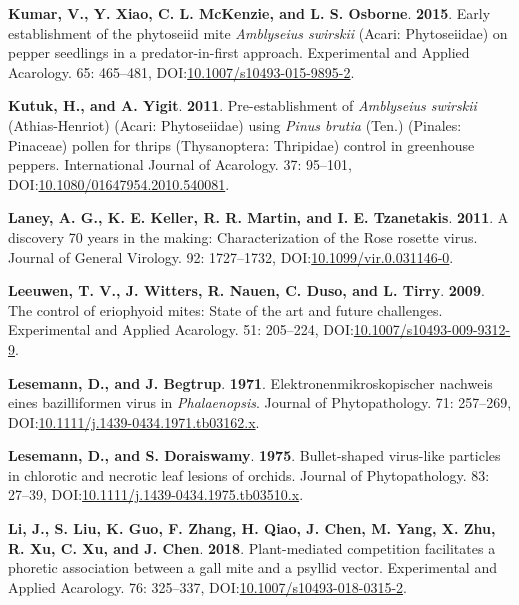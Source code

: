 \documentclass[12pt,final,CPage]{ufthesis}
\newlength{\cslhangindent}
\newenvironment{CSLReferences}[2] %
{%
	\setlength{\parindent}{0pt}
	\ifodd #1 \everypar{\setlength{\hangindent}{\cslhangindent}}\ignorespaces\fi
	\ifnum #2 > 0
	\setlength{\parskip}{#2\baselineskip}
	\fi
}%
{}
\begin{document}
{\begin{CSLReferences}{1}{0}
  \leavevmode{}%
  \textbf{Kumar, V., Y. Xiao, C. L. McKenzie, and L. S. Osborne}. \textbf{2015}. Early establishment of the phytoseiid mite {\emph{Amblyseius swirskii}} ({Acari}: {Phytoseiidae}) on pepper seedlings in a predator-in-first approach. Experimental and Applied Acarology. 65: 465--481, DOI:\href{https://doi.org/10.1007/s10493-015-9895-2}{10.1007/s10493-015-9895-2}.

  \leavevmode{}%
  \textbf{Kutuk, H., and A. Yigit}. \textbf{2011}. Pre-establishment of {\emph{Amblyseius swirskii}} {(Athias-Henriot)} {({Acari}: {Phytoseiidae})} using {\emph{Pinus brutia}} {(Ten.)} {(Pinales: Pinaceae)} pollen for thrips {(Thysanoptera: Thripidae)} control in greenhouse peppers. International Journal of Acarology. 37: 95--101, DOI:\href{https://doi.org/10.1080/01647954.2010.540081}{10.1080/01647954.2010.540081}.

  \leavevmode{}%
  \textbf{Laney, A. G., K. E. Keller, R. R. Martin, and I. E. Tzanetakis}. \textbf{2011}. A discovery 70 years in the making: Characterization of the {Rose rosette virus}. Journal of General Virology. 92: 1727--1732, DOI:\href{https://doi.org/10.1099/vir.0.031146-0}{10.1099/vir.0.031146-0}.

  \leavevmode{}%
  \textbf{Leeuwen, T. V., J. Witters, R. Nauen, C. Duso, and L. Tirry}. \textbf{2009}. The control of eriophyoid mites: State of the art and future challenges. Experimental and Applied Acarology. 51: 205--224, DOI:\href{https://doi.org/10.1007/s10493-009-9312-9}{10.1007/s10493-009-9312-9}.

  \leavevmode{}%
  \textbf{Lesemann, D., and J. Begtrup}. \textbf{1971}. Elektronenmikroskopischer nachweis eines bazilliformen virus in {\emph{Phalaenopsis}}. Journal of Phytopathology. 71: 257--269, DOI:\href{https://doi.org/10.1111/j.1439-0434.1971.tb03162.x}{10.1111/j.1439-0434.1971.tb03162.x}.

  \leavevmode{}%
  \textbf{Lesemann, D., and S. Doraiswamy}. \textbf{1975}. Bullet-shaped virus-like particles in chlorotic and necrotic leaf lesions of orchids. Journal of Phytopathology. 83: 27--39, DOI:\href{https://doi.org/10.1111/j.1439-0434.1975.tb03510.x}{10.1111/j.1439-0434.1975.tb03510.x}.

  \leavevmode{}%
  \textbf{Li, J., S. Liu, K. Guo, F. Zhang, H. Qiao, J. Chen, M. Yang, X. Zhu, R. Xu, C. Xu, and J. Chen}. \textbf{2018}. Plant-mediated competition facilitates a phoretic association between a gall mite and a psyllid vector. Experimental and Applied Acarology. 76: 325--337, DOI:\href{https://doi.org/10.1007/s10493-018-0315-2}{10.1007/s10493-018-0315-2}.


\end{CSLReferences}}
\end{document}
